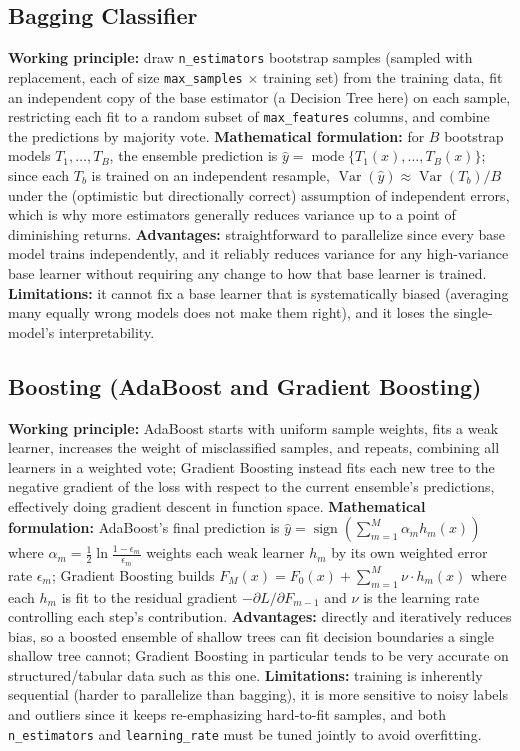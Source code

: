 \documentclass[11pt,a4paper]{article}
\begin{document}
\subsection{Bagging Classifier}
\textbf{Working principle:} draw \texttt{n\_estimators} bootstrap samples (sampled with replacement, each of size \texttt{max\_samples} $\times$ training set) from the training data, fit an independent copy of the base estimator (a Decision Tree here) on each sample, restricting each fit to a random subset of \texttt{max\_features} columns, and combine the predictions by majority vote.
\textbf{Mathematical formulation:} for $B$ bootstrap models $T_1,\dots,T_B$, the ensemble prediction is $\hat y = \operatorname{mode}\{T_1(x),\dots,T_B(x)\}$; since each $T_b$ is trained on an independent resample, $\operatorname{Var}(\hat y) \approx \operatorname{Var}(T_b)/B$ under the (optimistic but directionally correct) assumption of independent errors, which is why more estimators generally reduces variance up to a point of diminishing returns.
\textbf{Advantages:} straightforward to parallelize since every base model trains independently, and it reliably reduces variance for any high-variance base learner without requiring any change to how that base learner is trained.
\textbf{Limitations:} it cannot fix a base learner that is systematically biased (averaging many equally wrong models does not make them right), and it loses the single-model's interpretability.

\subsection{Boosting (AdaBoost and Gradient Boosting)}
\textbf{Working principle:} AdaBoost starts with uniform sample weights, fits a weak learner, increases the weight of misclassified samples, and repeats, combining all learners in a weighted vote; Gradient Boosting instead fits each new tree to the negative gradient of the loss with respect to the current ensemble's predictions, effectively doing gradient descent in function space.
\textbf{Mathematical formulation:} AdaBoost's final prediction is $\hat y = \operatorname{sign}\left(\sum_{m=1}^M \alpha_m h_m(x)\right)$ where $\alpha_m = \frac{1}{2}\ln\frac{1-\epsilon_m}{\epsilon_m}$ weights each weak learner $h_m$ by its own weighted error rate $\epsilon_m$; Gradient Boosting builds $F_M(x) = F_0(x) + \sum_{m=1}^M \nu \cdot h_m(x)$ where each $h_m$ is fit to the residual gradient $-\partial L/\partial F_{m-1}$ and $\nu$ is the learning rate controlling each step's contribution.
\textbf{Advantages:} directly and iteratively reduces bias, so a boosted ensemble of shallow trees can fit decision boundaries a single shallow tree cannot; Gradient Boosting in particular tends to be very accurate on structured/tabular data such as this one.
\textbf{Limitations:} training is inherently sequential (harder to parallelize than bagging), it is more sensitive to noisy labels and outliers since it keeps re-emphasizing hard-to-fit samples, and both \texttt{n\_estimators} and \texttt{learning\_rate} must be tuned jointly to avoid overfitting.
\end{document}
